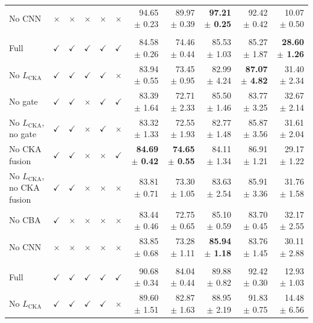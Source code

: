 \documentclass[10pt]{article}
\begin{document}
{\begin{longtable}{lccccc rrrrr}
No CNN & $\times$ & $\times$ & $\times$ & $\times$ & $\times$ & 94.65 $\pm$ 0.23 & 89.97 $\pm$ 0.39 & \textbf{97.21 $\pm$ 0.25} & 92.42 $\pm$ 0.42 & 10.07 $\pm$ 0.50 \\
\addlinespace[4pt]
\multicolumn{11}{l}{\textit{Source: OTU $\rightarrow$ Target: USOVA}} \\
\midrule
Full & $\checkmark$ & $\checkmark$ & $\checkmark$ & $\checkmark$ & $\checkmark$ & 84.58 $\pm$ 0.26 & 74.46 $\pm$ 0.44 & 85.53 $\pm$ 1.03 & 85.27 $\pm$ 1.87 & \textbf{28.60 $\pm$ 1.26} \\
No $L_{\mathrm{CKA}}$ & $\checkmark$ & $\checkmark$ & $\checkmark$ & $\checkmark$ & $\times$ & 83.94 $\pm$ 0.55 & 73.45 $\pm$ 0.95 & 82.99 $\pm$ 4.24 & \textbf{87.07 $\pm$ 4.82} & 31.40 $\pm$ 2.34 \\
No gate & $\checkmark$ & $\checkmark$ & $\times$ & $\checkmark$ & $\checkmark$ & 83.39 $\pm$ 1.64 & 72.71 $\pm$ 2.33 & 85.50 $\pm$ 1.46 & 83.77 $\pm$ 3.25 & 32.67 $\pm$ 2.14 \\
No $L_{\mathrm{CKA}}$, no gate & $\checkmark$ & $\checkmark$ & $\times$ & $\checkmark$ & $\times$ & 83.32 $\pm$ 1.33 & 72.55 $\pm$ 1.93 & 82.77 $\pm$ 1.48 & 85.87 $\pm$ 3.56 & 31.61 $\pm$ 2.04 \\
No CKA fusion & $\checkmark$ & $\checkmark$ & $\times$ & $\times$ & $\checkmark$ & \textbf{84.69 $\pm$ 0.42} & \textbf{74.65 $\pm$ 0.55} & 84.11 $\pm$ 1.34 & 86.91 $\pm$ 1.21 & 29.17 $\pm$ 1.22 \\
No $L_{\mathrm{CKA}}$, no CKA fusion & $\checkmark$ & $\checkmark$ & $\times$ & $\times$ & $\times$ & 83.81 $\pm$ 0.71 & 73.30 $\pm$ 1.05 & 83.63 $\pm$ 2.54 & 85.91 $\pm$ 3.36 & 31.76 $\pm$ 1.58 \\
No CBA & $\checkmark$ & $\times$ & $\times$ & $\times$ & $\times$ & 83.44 $\pm$ 0.46 & 72.75 $\pm$ 0.65 & 85.10 $\pm$ 0.59 & 83.70 $\pm$ 0.45 & 32.17 $\pm$ 2.55 \\
No CNN & $\times$ & $\times$ & $\times$ & $\times$ & $\times$ & 83.85 $\pm$ 0.68 & 73.28 $\pm$ 1.11 & \textbf{85.94 $\pm$ 1.18} & 83.76 $\pm$ 1.45 & 30.11 $\pm$ 2.88 \\
\addlinespace[4pt]
\multicolumn{11}{l}{\textit{Source: OVATUS $\rightarrow$ Target: OTU}} \\
\midrule
Full & $\checkmark$ & $\checkmark$ & $\checkmark$ & $\checkmark$ & $\checkmark$ & 90.68 $\pm$ 0.34 & 84.04 $\pm$ 0.44 & 89.88 $\pm$ 0.82 & 92.42 $\pm$ 0.30 & 12.93 $\pm$ 1.03 \\
No $L_{\mathrm{CKA}}$ & $\checkmark$ & $\checkmark$ & $\checkmark$ & $\checkmark$ & $\times$ & 89.60 $\pm$ 1.51 & 82.87 $\pm$ 1.63 & 88.95 $\pm$ 2.19 & 91.83 $\pm$ 0.75 & 14.48 $\pm$ 6.56 \\

\end{longtable}}
\end{document}
